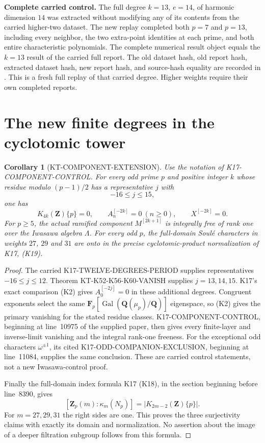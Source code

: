 \documentclass[11pt,a4paper]{article}
\newtheorem{corollary}[theorem]{Corollary}
\theoremstyle{definition}
\renewcommand{\paragraph}[1]{\par\smallskip\noindent\textbf{#1}\quad\ignorespaces}
\begin{document}
\paragraph{Complete carried control.}
The full degree $k=13$, $e=14$, of harmonic dimension $14$
was extracted without modifying any of its contents from
the carried higher-two dataset.  The new replay completed
both $p=7$ and $p=13$, including every neighbor, the two
extra-point identities at each prime, and both entire
characteristic polynomials.  The complete numerical result
object equals the $k=13$ result of the carried full report.
The old dataset hash, old report hash, extracted dataset
hash, new report hash, and source-hash equality are recorded
in .
This is a fresh full replay of that carried degree.  Higher
weights require their own completed reports.



\section{The new finite degrees in the cyclotomic tower}
\label{sec:component-extension}

\begin{corollary}[KT-COMPONENT-EXTENSION]
Use the notation of K17-COMPONENT-CONTROL. For every odd prime
$p$ and positive integer $k$ whose residue modulo $(p-1)/2$
has a representative $j$ with
\[
                         -16\le j\le15,
\]
one has
\[
 K_{4k}(\mathbf Z)\{p\}=0,\qquad
 A_n^{[-2k]}=0\ (n\ge0),\qquad X^{[-2k]}=0.
\]
For $p\ge5$, the actual ramified component $M^{[2k+1]}$ is
integrally free of rank one over the Iwasawa algebra $\Lambda$.
For every odd $p$, the full-domain Soul\'e characters in weights
$27$, $29$ and $31$ are onto in the precise cyclotomic-product
normalization of K17, (K19).
\end{corollary}
\begin{proof}
The carried K17-TWELVE-DEGREES-PERIOD supplies representatives
$-16\le j\le12$. Theorem KT-K52-K56-K60-VANISH supplies $j=13,14,15$.
K17's exact comparison (K2) gives $A_0^{[-2j]}=0$ in these
additional degrees. Congruent exponents select the same
$\mathbf F_p[\operatorname{Gal}(\mathbf Q(\mu_p)/\mathbf Q)]$
eigenspace, so (K2) gives the primary vanishing for the stated
residue classes. K17-COMPONENT-CONTROL, beginning at line~10975
of the supplied paper, then gives every finite-layer and
inverse-limit vanishing and the integral rank-one freeness.
For the exceptional odd characters $\omega^{\pm1}$, its cited
K17-ODD-COMPANION-EXCLUSION, beginning at line~11084,
supplies the same conclusion. These are carried control
statements, not a new Iwasawa-control proof.

Finally the full-domain index formula K17 (K18), in the section
beginning before line~8390, gives
\[
 [\mathbf Z_p(m):\kappa_m(N_p)]
       =|K_{2m-2}(\mathbf Z)\{p\}|.
\]
For $m=27,29,31$ the right sides are one. This proves the three
surjectivity claims with exactly its domain and normalization.
No assertion about the image of a deeper filtration subgroup
follows from this formula.
\end{proof}
\end{document}
